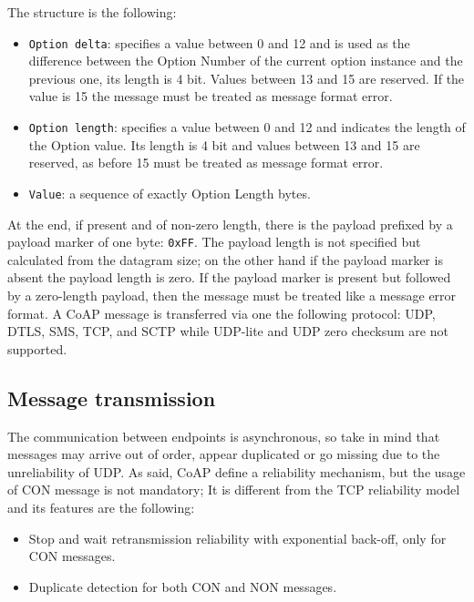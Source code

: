 	The structure is the following:\newline
	\begin{itemize}
		\item \texttt{Option delta}: specifies a value between 0 and 12 and is used as the difference between the Option Number of the current option instance and the previous one, its length is 4 bit.
		Values between 13 and 15 are reserved.
		If the value is 15 the message must be treated as message format error.
		\item \texttt{Option length}: specifies a value between 0 and 12 and indicates the length of the Option value.
		Its length is 4 bit and values between 13 and 15 are reserved, as before 15 must be treated as message format error.
		\item \texttt{Value}: a sequence of exactly Option Length bytes.
	\end{itemize}

	At the end, if present and of non-zero length, there is the payload prefixed by a payload marker of one byte: \texttt{0xFF}.\newline
	The payload length is not specified but calculated from the datagram size; on the other hand if the payload marker is absent the payload length is zero.\newline
	If the payload marker is present but followed by a zero-length payload, then the message must be treated like a message error format.\newline
	A CoAP message is transferred via one the following protocol: UDP, DTLS, SMS, TCP, and SCTP while UDP-lite and UDP zero checksum are not supported.\newline

	
	\subsection{Message transmission}
	The communication between endpoints is asynchronous, so take in mind that messages may arrive out of order, appear duplicated or go missing due to the unreliability of UDP.\newline
	As said, CoAP define a reliability mechanism, but the usage of CON message is not mandatory; It is different from the TCP reliability model and its features are the following:\newline
	\begin{itemize}
		\item Stop and wait retransmission reliability with exponential back-off, only for CON messages.
		\item Duplicate detection for both CON and NON messages.
	\end{itemize}

